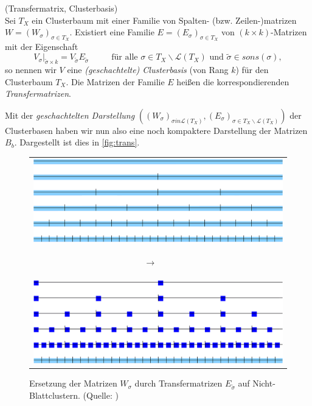     \begin{defn}
      (Transfermatrix, Clusterbasis)\\
      Sei $T_X$ ein Clusterbaum mit einer Familie von Spalten- (bzw. Zeilen-)matrizen $W = \left(W_\sigma\right)_{\sigma \in T_X}$. Existiert eine Familie $E = \left(E_\sigma\right)_{\sigma \in T_X}$ von 
      $\left(k \times k\right)$-Matrizen mit der
      Eigenschaft
      \begin{equation*}
	\left. V_\sigma \right|_{\tilde \sigma \times k} = V_{\tilde \sigma} E_{\tilde \sigma} \ \ \ \ \ \ \ \ \ \ \ \ \text{für alle } 
	\sigma \in T_X \backslash \mathcal{L}\left(T_X\right) \text{ und } \tilde \sigma \in sons\left(\sigma\right),
      \end{equation*}
      so nennen wir $V$ eine \textit{(geschachtelte) Clusterbasis} (von Rang $k$) für den Clusterbaum $T_X$. Die Matrizen der Familie $E$ heißen die korrespondierenden \textit{Transfermatrizen}.
      \citep{nichtlokop}
    \end{defn}

    Mit der \textit{geschachtelten Darstellung} $\left(\left(W_\sigma\right)_{\sigma in \mathcal{L}\left(T_X\right)} , \left(E_\sigma\right)_{\sigma \in T_X \backslash \mathcal{L}\left(T_X\right)}\right)$ der Clusterbasen haben wir nun also eine 
    noch kompaktere Darstellung der Matrizen $B_b$. Dargestellt ist dies in \autoref{fig:trans}.
    
    \begin{figure}[t]
      \begin{tabular}{c}
	\includegraphics{img/cbaum_full.png}\\
	
	\begin{turn}{-90} $\longrightarrow$ \ \ \  \end{turn}\\
	
	\includegraphics{img/cbaum_transfer.png}
      \end{tabular}
      \caption{Ersetzung der Matrizen $W_\sigma$ durch Transfermatrizen $E_{\tilde \sigma}$ auf Nicht-Blattclustern. (Quelle: \citet{h2slides})}
      \label{fig:trans}
    \end{figure}

